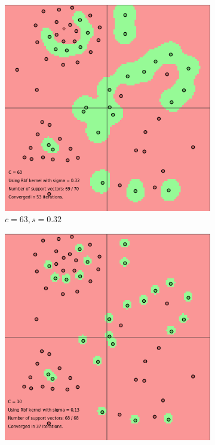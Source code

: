 \documentclass{article}
\begin{document}
\begin{figure}
\bigskip
\begin{subfigure}{0.3\textwidth}
   \includegraphics[width=\linewidth]{c=63_s=032}
   \caption{$c=63, s=0.32$} \label{fig:x_d}
\end{subfigure}
\hspace*{\fill}
\begin{subfigure}{0.3\textwidth}
   \includegraphics[width=\linewidth]{c_10_s013}

\end{subfigure}
\end{figure}
\end{document}
